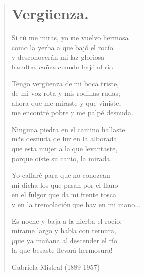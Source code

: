 \documentclass[12pt, twoside]{book}
\begin{document}
\begin{verse}
\begin{center}
\section{Vergüenza.}
\end{center}

Si tú me miras, yo me vuelvo hermosa\\
como la yerba a que bajó el rocío\\
y desconocerán mi faz gloriosa\\
las altas cañas cuando bajé al río.\newline

Tengo vergüenza de mi boca triste,\\
de mi voz rota y mis rodillas rudas;\\
ahora que me miraste y que viniste,\\
me encontré pobre y me palpé desnuda.\newline

Ninguna piedra en el camino hallaste\\
más desnuda de luz en la alborada\\
que esta mujer a la que levantaste,\\
porque oíste su canto, la mirada.\newline

Yo callaré para que no conozcan\\
mi dicha los que pasan por el llano\\
en el fulgor que da mi frente tosca\\
y en la tremolación que hay en mi mano...\newline

Es noche y baja a la hierba el rocío;\\
mírame largo y habla con ternura,\\
¡que ya mañana al descender el río\\
la que besaste llevará hermosura!\newline

Gabriela Mistral (1889-1957)

\end{verse}
\newpage
\end{document}
